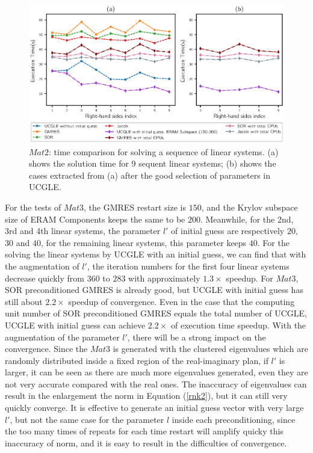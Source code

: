 \begin{figure}[htbp]
	\centering
	\includegraphics[width=0.99\linewidth]{fig/seqrhs3.eps}
	\caption{$Mat2$: time comparison for solving a sequence of linear systems. (a) shows the solution time for 9 sequent linear systems; (b) shows the cases extracted from (a) after the good selection of parameters in UCGLE.}
	\label{fig:seqrhs3}
\end{figure}

For the tests of $Mat3$, the GMRES restart size is $150$, and the Krylov subspace size of ERAM Components keeps the same to be $200$. Meanwhile, for the 2nd, 3rd and 4th linear systems, the parameter $l'$ of initial guess are respectively $20$, $30$ and $40$, for the remaining linear systems, this parameter keeps $40$. For the solving the linear systems by UCGLE with an initial guess, we can find that with the augmentation of $l'$, the iteration numbers for the first four linear systems decrease quickly from $360$ to $283$ with approximately $1.3 \times$ speedup. For $Mat3$, SOR preconditioned GMRES is already good, but UCGLE with initial guess has still about $2.2 \times$ speedup of convergence. Even in the case that the computing unit number of SOR preconditioned GMRES equals the total number of UCGLE, UCGLE with initial guess can achieve $2.2 \times$ of execution time speedup. With the augmentation of the parameter $l'$, there will be a strong impact on the convergence. Since the $Mat3$ is generated with the clustered eigenvalues which are randomly distributed inside a fixed region of the real-imaginary plan, if $l'$ is larger, it can be seen as there are much more eigenvalues generated, even they are not very accurate compared with the real ones. The inaccuracy of eigenvalues can result in the enlargement the norm in Equation (\ref{rnk2}), but it can still very quickly converge. It is effective to generate an initial guess vector with very large $l'$, but not the same case for the parameter $l$ inside each preconditioning, since the too many times of repeats for each time restart will amplify quicky this inaccuracy of norm, and it is easy to result in the difficulties of convergence.


